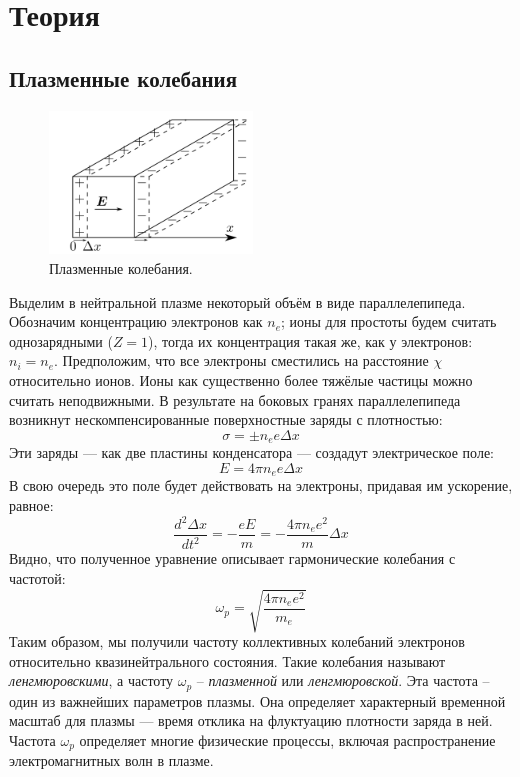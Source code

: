 \section*{Теория}

\subsection*{Плазменные колебания}

\begin{figure}
	\vspace{-10pt}
	\centering
	\includegraphics[width=0.48\textwidth]{../res/plasma.png}
	\caption{Плазменные колебания.}
	\label{img:plasma oscil}
\end{figure}

Выделим в нейтральной плазме некоторый объём в виде параллелепипеда. Обозначим концентрацию электронов как $n_e$; ионы для простоты будем считать однозарядными ($Z = 1$), тогда их концентрация такая же, как у электронов: $n_i = n_e$. Предположим, что все электроны сместились на расстояние $\chi$ относительно ионов. Ионы как существенно более тяжёлые частицы можно считать неподвижными. В результате на боковых гранях параллелепипеда возникнут нескомпенсированные поверхностные заряды с плотностью:
$$
\sigma = \pm n_e e \Delta x
$$
Эти заряды --- как две пластины конденсатора --- создадут электрическое поле:
$$
E = 4 \pi n_e e \Delta x
$$
В свою очередь это поле будет действовать на электроны, придавая им
ускорение, равное:
$$
\frac{d^2 \Delta x}{d t^2} = - \frac{eE}{m} = -\frac{4 \pi n_e e^2}{m} \Delta x
$$
Видно, что полученное уравнение описывает гармонические колебания
с частотой:
$$
\omega_p = \sqrt{\frac{4 \pi n_e e^2}{m_e}}
$$
Таким образом, мы получили частоту коллективных колебаний электронов относительно квазинейтрального состояния. Такие колебания называют \textit{ленгмюровскими}, а частоту $\omega_p$ -- \textit{плазменной} или \textit{ленгмюровской}. Эта частота -- один из важнейших параметров плазмы. Она определяет характерный временной масштаб для плазмы — время отклика на флуктуацию плотности заряда в ней. Частота $\omega_p$ определяет многие физические процессы, включая распространение электромагнитных волн в плазме.

